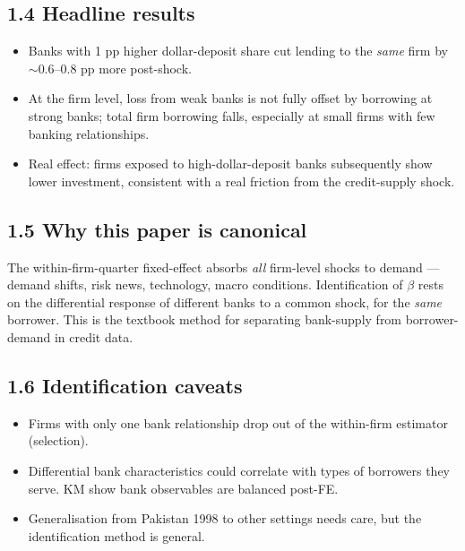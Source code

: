 \documentclass[11pt]{article}
\begin{document}
\subsection*{1.4 Headline results}
\begin{itemize}
\item Banks with 1 pp higher dollar-deposit share cut lending to the \emph{same} firm by $\sim$0.6--0.8 pp more post-shock.
\item At the firm level, loss from weak banks is not fully offset by borrowing at strong banks; total firm borrowing falls, especially at small firms with few banking relationships.
\item Real effect: firms exposed to high-dollar-deposit banks subsequently show lower investment, consistent with a real friction from the credit-supply shock.
\end{itemize}

\subsection*{1.5 Why this paper is canonical}
\begin{keybox}
The within-firm-quarter fixed-effect absorbs \emph{all} firm-level shocks to demand --- demand shifts, risk news, technology, macro conditions. Identification of $\beta$ rests on the differential response of different banks to a common shock, for the \emph{same} borrower. This is the textbook method for separating bank-supply from borrower-demand in credit data.
\end{keybox}

\subsection*{1.6 Identification caveats}
\begin{alertbox}
\begin{itemize}
\item Firms with only one bank relationship drop out of the within-firm estimator (selection).
\item Differential bank characteristics could correlate with types of borrowers they serve. KM show bank observables are balanced post-FE.
\item Generalisation from Pakistan 1998 to other settings needs care, but the identification method is general.
\end{itemize}
\end{alertbox}
\end{document}
